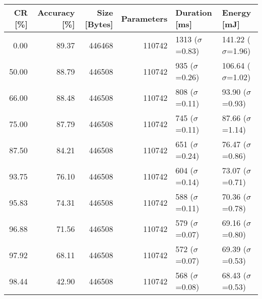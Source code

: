 \begin{tabular}{rrrrll}
\toprule
   CR [\%] & Accuracy [\%] & Size [Bytes] & Parameters &         Duration [ms] &             Energy [mJ] \\
\midrule
      0.00 &         89.37 &       446468 &     110742 &  1313 ($\sigma$=0.83) &  141.22 ($\sigma$=1.96) \\
     50.00 &         88.79 &       446508 &     110742 &   935 ($\sigma$=0.26) &  106.64 ($\sigma$=1.02) \\
     66.00 &         88.48 &       446508 &     110742 &   808 ($\sigma$=0.11) &   93.90 ($\sigma$=0.93) \\
     75.00 &         87.79 &       446508 &     110742 &   745 ($\sigma$=0.11) &   87.66 ($\sigma$=1.14) \\
     87.50 &         84.21 &       446508 &     110742 &   651 ($\sigma$=0.24) &   76.47 ($\sigma$=0.86) \\
     93.75 &         76.10 &       446508 &     110742 &   604 ($\sigma$=0.14) &   73.07 ($\sigma$=0.71) \\
     95.83 &         74.31 &       446508 &     110742 &   588 ($\sigma$=0.11) &   70.36 ($\sigma$=0.78) \\
     96.88 &         71.56 &       446508 &     110742 &   579 ($\sigma$=0.07) &   69.16 ($\sigma$=0.80) \\
     97.92 &         68.11 &       446508 &     110742 &   572 ($\sigma$=0.07) &   69.39 ($\sigma$=0.53) \\
     98.44 &         42.90 &       446508 &     110742 &   568 ($\sigma$=0.08) &   68.43 ($\sigma$=0.53) \\
\bottomrule
\end{tabular}
